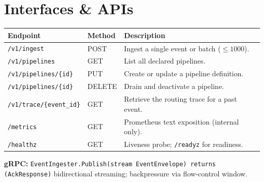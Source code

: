 \section{Interfaces \& APIs}

\begin{tabularx}{\linewidth}{@{}llX@{}}
  \toprule
  \textbf{Endpoint} & \textbf{Method} & \textbf{Description} \\
  \midrule
  \texttt{/v1/ingest}             & POST   & Ingest a single event or batch ($\leq 1000$). \\[2pt]
  \texttt{/v1/pipelines}          & GET    & List all declared pipelines. \\[2pt]
  \texttt{/v1/pipelines/\{id\}}   & PUT    & Create or update a pipeline definition. \\[2pt]
  \texttt{/v1/pipelines/\{id\}}   & DELETE & Drain and deactivate a pipeline. \\[2pt]
  \texttt{/v1/trace/\{event\_id\}} & GET   & Retrieve the routing trace for a past event. \\[2pt]
  \texttt{/metrics}               & GET    & Prometheus text exposition (internal only). \\[2pt]
  \texttt{/healthz}               & GET    & Liveness probe; \texttt{/readyz} for readiness. \\
  \bottomrule
\end{tabularx}

\vspace{4pt}
\textbf{gRPC:} \texttt{EventIngester.Publish(stream EventEnvelope) returns (AckResponse)}
\textendash{} bidirectional streaming; backpressure via flow-control window.

